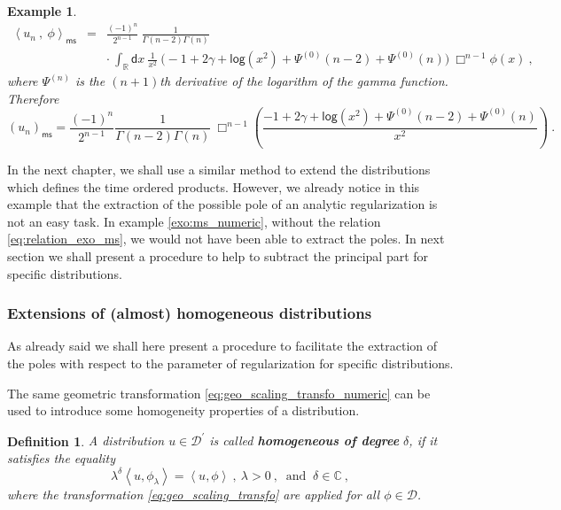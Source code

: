 \documentclass[11pt]{book}
\newcommand{\ms}{\mathsf{ms}}
\renewcommand{\log}{\mathsf{log}}
\newcommand{\sm}[1]{\left\langle#1\right\rangle}
\newcommand{\Dcal}{\mathcal{D}}
\newcommand{\Cbb}{\mathbb{C}}
\newcommand{\Rbb}{\mathbb{R}}
\newcommand{\dsf}{\mathsf{d}}
\theoremstyle{break}
\newtheorem{example}{Example}[chapter]
\newtheorem{definition}{Definition}[chapter]
\begin{document}
\begin{example}
\begin{eqnarray*}
\sm{u_n \ , \ \phi}_\ms &=& \frac{(-1)^{n}}{2^{n-1}} \ \frac{1}{\Gamma(n-2)\Gamma(n)} \\
&& \cdot \ \int_{\Rbb} \dsf x \ \frac{1}{x^2} \ \bigg( -1 + 2 \gamma + \log(x^2) + \Psi^{(0)}(n-2) + \Psi^{(0)}(n) \bigg) \ \Box^{n-1} \phi(x) \ ,
\end{eqnarray*}
%
where $\Psi^{(n)}$ is the $(n+1)$th derivative of the logarithm of the gamma function. Therefore
%
\begin{equation*}
\left(u_n\right)_\ms = \frac{(-1)^{n}}{2^{n-1}} \frac{1}{\Gamma(n-2)\Gamma(n)} \ \Box^{n-1} \left( \frac{-1 + 2 \gamma + \log(x^2) + \Psi^{(0)}(n-2) + \Psi^{(0)}(n)}{x^2} \right) \ .
\end{equation*}
%
\end{example}

In the next chapter, we shall use a similar method to extend the distributions which defines the time ordered products. However, we already notice in this example that the extraction of the possible pole of an analytic regularization is not an easy task. In example \ref{exo:ms_numeric}, without the relation \eqref{eq:relation_exo_ms}, we would not have been able to extract the poles. In next section we shall present a procedure to help to subtract the principal part for specific distributions.


\subsubsection{Extensions of (almost) homogeneous distributions}


As already said we shall here present a procedure to facilitate the extraction of the poles with respect to the parameter of regularization for specific distributions.


The same geometric transformation \eqref{eq:geo_scaling_transfo_numeric} can be used to introduce some homogeneity properties of a distribution.


\begin{definition}\label{def:homogeneous_numeric}
A distribution $u \in \Dcal^\prime$ is called {\bf homogeneous of degree} $\delta$, if it satisfies the equality
%
\begin{equation}
\lambda^{\delta} \sm{ u , \phi_\lambda } = \sm{ u , \phi } \ , \ \lambda > 0 \ , \ \mbox{ and } \ \delta \in \Cbb \ ,
\label{eq:homog_id}
\end{equation}
%
where the transformation \eqref{eq:geo_scaling_transfo} are applied for all $\phi \in \Dcal$.
\end{definition}
\end{document}
